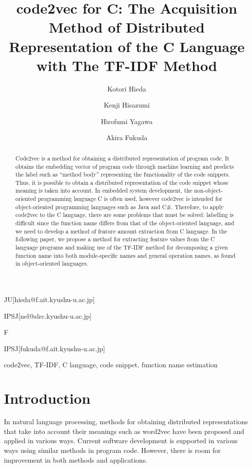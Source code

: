 \documentclass[JIP]{apris}
\begin{document}
\title{code2vec for C: The Acquisition Method of Distributed Representation of the C Language with The TF-IDF Method}


\author{Kotori Hieda}{JU}[hieda@f.ait.kyushu-u.ac.jp]
\author{Kenji Hisazumi}{IPSJ}[nel@slrc.kyushu-u.ac.jp]
\author{Hirofumi Yagawa}{F}
\author{Akira Fukuda}{IPSJ}[fukuda@f.ait.kyushu-u.ac.jp]


\begin{abstract}
Code2vec is a method for obtaining a distributed representation of program code. It obtains the embedding vector of program code through machine learning and predicts the label such as ``method body'' representing the functionality of the code snippets. Thus, it is possible to obtain a distributed representation of the code snippet whose meaning is taken into account. In embedded system development, the non-object-oriented programming language C is often used, however code2vec is intended for object-oriented programming languages such as Java and C\#. Therefore, to apply code2vec to the C language, there are some problems that must be solved: labelling is difficult since the function name differs from that of the object-oriented language, and we need to develop a method of feature amount extraction from C language. In the following paper, we propose a method for extracting feature values from the C language programs and making use of the TF-IDF method for decomposing a given function name into both module-specific names and general operation names, as found in object-oriented languages.
\end{abstract}

\begin{keyword}
code2vec, TF-IDF, C language, code snippet, function name estimation
\end{keyword}

\maketitle

\section{Introduction}
In natural language processing, methods for obtaining distributed representations that take into account their meanings such as word2vec\cite{rong2014word2vec} have been proposed and applied in various ways. Current software development is supported in various ways using similar methods in program code. However, there is room for improvement in both methods and applications. 
\end{document}

